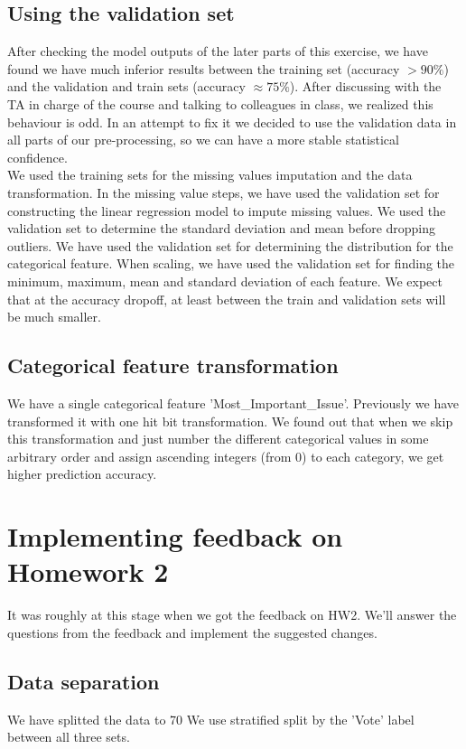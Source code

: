 \documentclass[12pt]{scrartcl}
\begin{document}
\subsection{Using the validation set}
After checking the model outputs of the later parts of this exercise, we have found we have much inferior results between the training set (accuracy $>90\%$) and the validation and train sets (accuracy $\approx 75\%$). 
After discussing with the TA in charge of the course and talking to colleagues in class, we realized this behaviour is odd. In an attempt to fix it we decided to use the validation data in all parts of our pre-processing, so we can have a more stable statistical confidence.\\
We used the training sets for the missing values imputation and the data transformation. In the missing value steps, we have used the validation set for constructing the linear regression model to impute missing values. We used the validation set to determine the standard deviation and mean before dropping outliers. We have used the validation set for determining the distribution for the categorical feature. When scaling, we have used the validation set for finding the minimum, maximum, mean and standard deviation of each feature. We expect that at the accuracy dropoff, at least between the train and validation sets will be much smaller.

\subsection{Categorical feature transformation}
We have a single categorical feature 'Most\_Important\_Issue'. Previously we have transformed it with one hit bit transformation. We found out that when we skip this transformation and just number the different categorical values in some arbitrary order and assign ascending integers (from 0) to each category, we get higher prediction accuracy.

\section{Implementing feedback on Homework 2}
It was roughly at this stage when we got the feedback on HW2. We'll answer the questions from the feedback and implement the suggested changes.
\subsection{Data separation}
We have splitted the data to 70%
We use stratified split by the 'Vote' label between all three sets.
\end{document}
